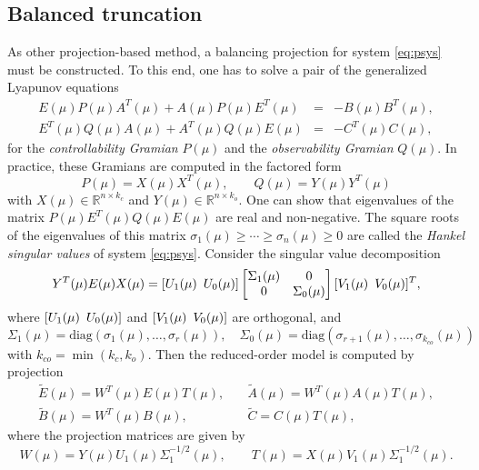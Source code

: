 \subsection{Balanced truncation}
As other projection-based method, a balancing projection for system \eqref{eq:psys} must be constructed. To this end, one has to solve a pair of the generalized Lyapunov equations
\begin{eqnarray}
\label{eq:LyapContr}
E(\mu)P(\mu)A^T\!(\mu) + A(\mu)P(\mu)E^T\!(\mu) & = & -B(\mu)B^T\!(\mu), \\
\label{eq:LyapObser}
E^T(\mu)Q(\mu)A(\mu) + A^T(\mu)Q(\mu)E(\mu) & = & -C^T(\mu)C(\mu),
\end{eqnarray}
for the \textit{controllability Gramian} $P(\mu)$ and the \textit{observability Gramian} $Q(\mu)$. In practice, 
these Gramians are computed in the factored form 
$$
P(\mu) = X(\mu)X^T(\mu), \qquad Q(\mu) = Y(\mu)Y^T(\mu)
$$ 
with $X(\mu)\in\mathbb{R}^{n\times k_c}$ and $Y(\mu)\in\mathbb{R}^{n\times k_o}$. One can show that eigenvalues of the matrix $P(\mu)E^T(\mu)Q(\mu)E(\mu)$ are real and non-negative. The square roots of the eigenvalues of this matrix $\sigma_1(\mu) \geq \cdots \geq \sigma_{n}(\mu)\geq 0$ are called the \textit{Hankel singular values} of system \eqref{eq:psys}. Consider the singular value decomposition 
\begin{align}
\label{eq:SVD}
Y^T(\mu)E(\mu)X(\mu) = [U_1(\mu)\enskip U_0(\mu)]\begin{bmatrix}
\Sigma_1(\mu) & 0\\ 0 & \Sigma_0(\mu)
\end{bmatrix} [V_1(\mu)\enskip V_0(\mu)]^T,
\end{align}
where $[U_1(\mu)\enskip U_0(\mu)]$ and $[V_1(\mu)\enskip V_0(\mu)]$ are orthogonal, and
$$
\Sigma_1(\mu) = \mbox{diag}(\sigma_1(\mu),\ldots,\sigma_r(\mu)), \quad 
\Sigma_0(\mu) = \mbox{diag}(\sigma_{r+1}(\mu),\ldots,\sigma_{k_{co}}(\mu))
$$
with $k_{co}=\min(k_c,k_o)$.
Then the reduced-order model is computed by projection 
\begin{equation}\label{eq:RedMatr}
\begin{array}{ll}
\tilde{E}(\mu) = W^T(\mu)E(\mu)T(\mu),& \quad \tilde{A}(\mu) = W^T(\mu)A(\mu)T(\mu), \\
\tilde{B}(\mu) = W^T(\mu)B(\mu), & \quad \tilde{C} = C(\mu)T(\mu),
\end{array}
\end{equation}
where the projection matrices are given by
\begin{equation}
W(\mu) = Y(\mu)U_1(\mu) \Sigma_1^{-1/2}(\mu), \qquad T(\mu) = X(\mu)V_1(\mu)\Sigma_1^{-1/2}(\mu).
\label{eq:WT}
\end{equation}
